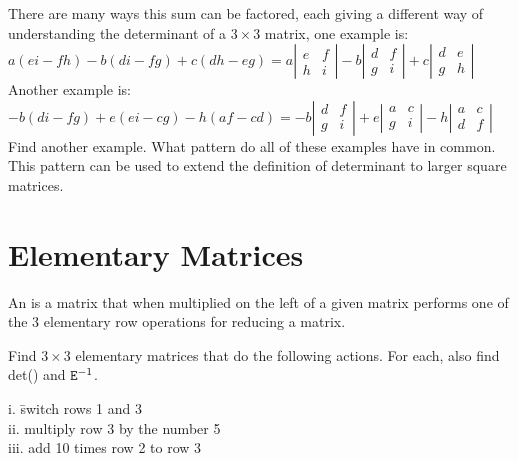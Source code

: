 \noindent {} There are many ways this sum can be factored, each giving a different way of understanding the determinant of a $3 \times 3$ matrix, one example is:\\
$a(ei-fh)-b(di-fg)+c(dh-eg) = a\left| \begin{array}{cc}e&f\\h&i \end{array} \right|-b\left| \begin{array}{cc}d&f\\g&i \end{array} \right| +c\left| \begin{array}{cc}d&e\\g&h \end{array} \right| $\\
Another example is: \\
$-b(di-fg) + e(ei-cg) - h(af-cd) = -b\left| \begin{array}{cc}d&f\\g&i \end{array} \right| + e\left| \begin{array}{cc}a&c\\g&i \end{array} \right| -h\left| \begin{array}{cc}a&c\\d&f \end{array} \right| $\\
Find another example. What pattern do all of these examples have in common. This pattern can be used to extend the definition of determinant to larger square matrices. 

\section{Elementary Matrices}    \label{Elementary Matrices}

\begin{defn}
	An  is a matrix that when multiplied on the left of a given matrix performs one of the 3 elementary row operations for reducing a matrix.
\end{defn}
 
\begin{myexa}[\bd{a}]
	Find $3 \times 3$ elementary matrices   that do the following actions. For each, also find  det()  and $\texttt{E}^{-1} $.
	\begin{tabbing}
		\indent i. \quad \= switch rows 1 and 3\\
		\indent ii.  \> multiply row 3 by the number 5 \\
		\indent iii. \> add 10 times row 2 to row 3
	\end{tabbing}
\end{myexa}


